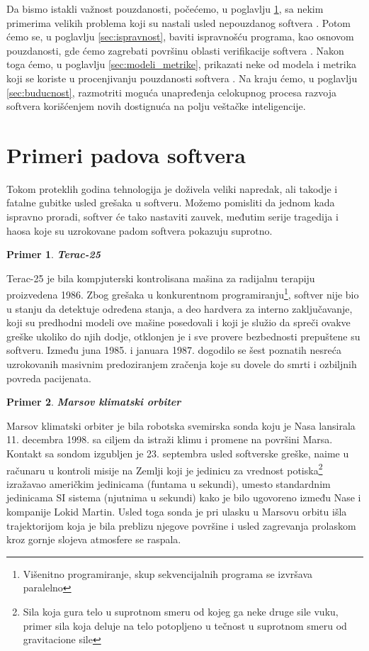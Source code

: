 \documentclass[a4paper]{article}
\newtheorem{primer}{Primer}[section]
\begin{document}
Da bismo istakli važnost pouzdanosti, počećemo, u poglavlju \ref{sec:primeri}, sa nekim primerima velikih problema koji su nastali usled nepouzdanog softvera \cite{quinn_ethics}.
Potom ćemo se, u poglavlju \ref{sec:ispravnost}, baviti ispravnošću programa, kao osnovom pouzdanosti, gde ćemo zagrebati površinu oblasti verifikacije softvera \cite{laski2009software}.
Nakon toga ćemo, u poglavlju \ref{sec:modeli_metrike}, prikazati neke od modela i metrika koji se koriste u procenjivanju pouzdanosti softvera \cite{pham_reliability}.
Na kraju ćemo, u poglavlju \ref{sec:buducnost}, razmotriti moguća unapređenja celokupnog procesa razvoja softvera korišćenjem novih dostignuća na polju veštačke inteligencije.


\section{Primeri padova softvera}
\label{sec:primeri}

Tokom proteklih godina tehnologija je doživela veliki napredak, ali takodje i fatalne gubitke usled grešaka u softveru.
Možemo pomisliti da jednom kada ispravno proradi, softver će tako nastaviti zauvek, međutim serije tragedija i haosa koje su uzrokovane padom
softvera pokazuju suprotno.\\

\begin{primer}
\textbf{Terac-25}
\end{primer}
Terac-25 je bila kompjuterski kontrolisana mašina za radijalnu terapiju proizvedena 1986.
Zbog grešaka u konkurentnom programiranju\footnote{ Višenitno programiranje, skup sekvencijalnih programa se izvršava paralelno}, softver nije bio u stanju da detektuje određena stanja, a deo hardvera za interno zaključavanje, koji su predhodni modeli ove mašine posedovali i koji je služio da spreči ovakve greške ukoliko do njih dodje, otklonjen je i sve provere bezbednosti prepuštene su softveru.
Između juna 1985. i januara 1987. dogodilo se šest poznatih nesreća uzrokovanih masivnim predoziranjem zračenja koje su dovele do smrti i ozbiljnih povreda pacijenata.\\

\begin{primer}
\textbf{Marsov klimatski orbiter}
\end{primer}
Marsov klimatski orbiter je bila robotska svemirska sonda koju je Nasa lansirala 11. decembra 1998. sa ciljem da istraži klimu i promene na površini Marsa. Kontakt sa sondom izgubljen je 23. septembra usled softverske greške, naime u računaru u kontroli misije na Zemlji koji je jedinicu za vrednost potiska\footnote{ Sila koja gura telo u suprotnom smeru od kojeg ga neke druge sile vuku, primer sila koja deluje na telo potopljeno u tečnost u suprotnom smeru od gravitacione sile} izražavao američkim jedinicama (funtama u sekundi), umesto standardnim jedinicama SI sistema (njutnima u sekundi) kako je bilo ugovoreno između Nase i kompanije Lokid Martin. Usled toga sonda je pri ulasku u Marsovu orbitu išla trajektorijom koja je bila preblizu njegove površine i usled zagrevanja prolaskom kroz gornje slojeva atmosfere se raspala.\\
\end{document}
